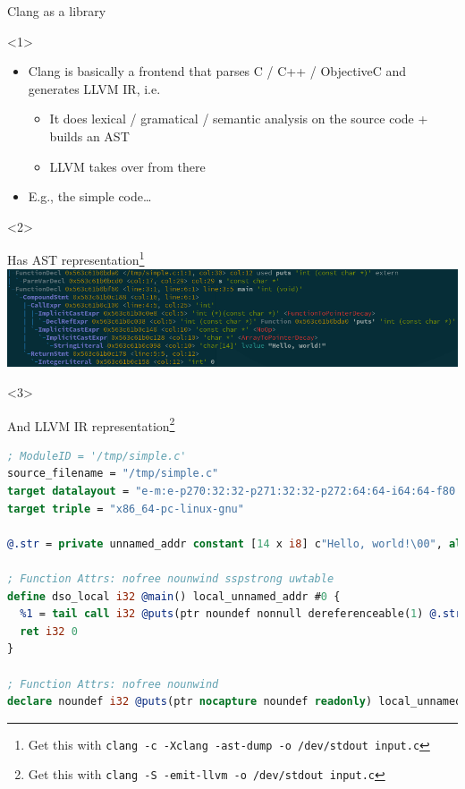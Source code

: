 \begin{frame}[fragile]{Clang as a library}
  \begin{onlyenv}<1>
    \begin{itemize}
      \itemsep=1ex

    \item Clang is basically a frontend that parses C / C++ / ObjectiveC and generates LLVM IR, i.e.
      \begin{itemize}
      \item It does lexical / gramatical /  semantic analysis on the source code + builds an AST
      \item LLVM takes over from there
      \end{itemize}

    \item E.g., the simple code\ldots{}
      
    \end{itemize}
  \end{onlyenv}

  \begin{onlyenv}<2>
    
    \vfill

    Has AST representation\footnote{Get this with \texttt{clang -c -Xclang -ast-dump -o /dev/stdout input.c}}
    \includegraphics[width=\textwidth]{img/clang-ast.png}
  \end{onlyenv}

  \begin{onlyenv}<3>
    
    \vfill

    And LLVM IR representation\footnote{Get this with \texttt{clang -S -emit-llvm -o /dev/stdout input.c}}
    \begin{lstlisting}[language=llvm,basicstyle={\ttfamily\fontsize{6.5}{6.5}\selectfont}]
; ModuleID = '/tmp/simple.c'
source_filename = "/tmp/simple.c"
target datalayout = "e-m:e-p270:32:32-p271:32:32-p272:64:64-i64:64-f80:128-n8:16:32:64-S128"
target triple = "x86_64-pc-linux-gnu"

@.str = private unnamed_addr constant [14 x i8] c"Hello, world!\00", align 1

; Function Attrs: nofree nounwind sspstrong uwtable
define dso_local i32 @main() local_unnamed_addr #0 {
  %1 = tail call i32 @puts(ptr noundef nonnull dereferenceable(1) @.str)
  ret i32 0
}

; Function Attrs: nofree nounwind
declare noundef i32 @puts(ptr nocapture noundef readonly) local_unnamed_addr #1
    \end{lstlisting}
  \end{onlyenv}
\end{frame}

